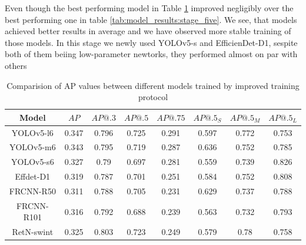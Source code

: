 Even though the best performing model in Table \ref{tab:improved:precision} improved negligibly over the best performing one in table \ref{tab:model_results:stage_five}. We see, that models achieved better results in average and we have observed more stable training of those models. In this stage we newly used YOLOv5-s and EfficienDet-D1, sespite both of them beiing low-parameter newtorks, they performed almost on par with others
\begin{table}[H]
    \centering
    \begin{tabular}{|c|c|c|c|c|c|c|c|}
        \hline
        Model      & $AP$  & $AP@.3$ & $AP@.5$ & $AP@.75$ & $AP@.5_S$ & $AP@.5_M$ & $AP@.5_L$ \\ \hline
        YOLOv5-l6  & 0.347 & 0.796   & 0.725   & 0.291    & 0.597     & 0.772     & 0.753     \\ \hline
        YOLOv5-m6  & 0.343 & 0.795   & 0.719   & 0.287    & 0.636     & 0.752     & 0.785     \\ \hline
        YOLOv5-s6  & 0.327 & 0.79    & 0.697   & 0.281    & 0.559     & 0.739     & 0.826     \\ \hline
        Effdet-D1  & 0.319 & 0.787   & 0.701   & 0.251    & 0.584     & 0.752     & 0.808     \\ \hline
        FRCNN-R50  & 0.311 & 0.788   & 0.705   & 0.231    & 0.629     & 0.737     & 0.788     \\ \hline
        FRCNN-R101 & 0.316 & 0.792   & 0.688   & 0.239    & 0.563     & 0.732     & 0.793     \\ \hline
        RetN-swint & 0.325 & 0.803   & 0.723   & 0.249    & 0.579     & 0.78      & 0.758     \\ \hline
    \end{tabular}
    \caption{Comparision of AP values between different models trained by improved training protocol}
    \label{tab:improved:precision}
\end{table}



